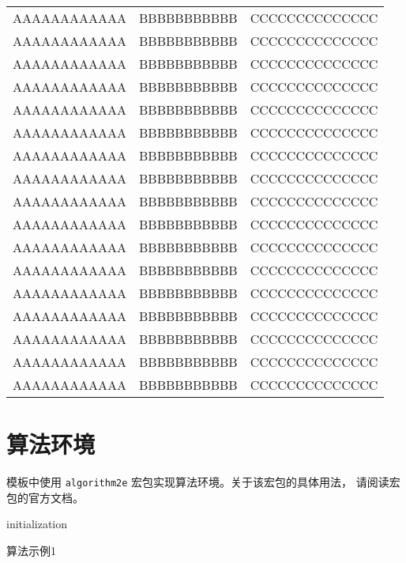 \begin{longtable}{ccc}
AAAAAAAAAAAA   &   BBBBBBBBBBB   &   CCCCCCCCCCCCCC   \\
AAAAAAAAAAAA   &   BBBBBBBBBBB   &   CCCCCCCCCCCCCC   \\
AAAAAAAAAAAA   &   BBBBBBBBBBB   &   CCCCCCCCCCCCCC   \\
AAAAAAAAAAAA   &   BBBBBBBBBBB   &   CCCCCCCCCCCCCC   \\
AAAAAAAAAAAA   &   BBBBBBBBBBB   &   CCCCCCCCCCCCCC   \\
AAAAAAAAAAAA   &   BBBBBBBBBBB   &   CCCCCCCCCCCCCC   \\
AAAAAAAAAAAA   &   BBBBBBBBBBB   &   CCCCCCCCCCCCCC   \\
AAAAAAAAAAAA   &   BBBBBBBBBBB   &   CCCCCCCCCCCCCC   \\
AAAAAAAAAAAA   &   BBBBBBBBBBB   &   CCCCCCCCCCCCCC   \\
AAAAAAAAAAAA   &   BBBBBBBBBBB   &   CCCCCCCCCCCCCC   \\
AAAAAAAAAAAA   &   BBBBBBBBBBB   &   CCCCCCCCCCCCCC   \\
AAAAAAAAAAAA   &   BBBBBBBBBBB   &   CCCCCCCCCCCCCC   \\
AAAAAAAAAAAA   &   BBBBBBBBBBB   &   CCCCCCCCCCCCCC   \\
AAAAAAAAAAAA   &   BBBBBBBBBBB   &   CCCCCCCCCCCCCC   \\
AAAAAAAAAAAA   &   BBBBBBBBBBB   &   CCCCCCCCCCCCCC   \\
AAAAAAAAAAAA   &   BBBBBBBBBBB   &   CCCCCCCCCCCCCC   \\
AAAAAAAAAAAA   &   BBBBBBBBBBB   &   CCCCCCCCCCCCCC   \\
\end{longtable}


\section{算法环境}
模板中使用 \texttt{algorithm2e} 宏包实现算法环境。关于该宏包的具体用法，
请阅读宏包的官方文档。

\begin{algorithm}[htbp]
\SetAlgoLined
{}

initialization\;
\caption{算法示例1}
\label{algo:algorithm1}
\end{algorithm}

